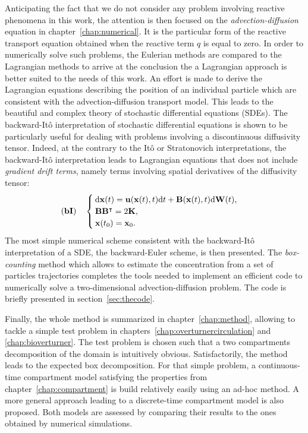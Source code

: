 Anticipating the fact that we do not consider any problem involving reactive phenomena in this work, the attention is then focused on the \textit{advection-diffusion} equation in chapter~\ref{chap:numerical}. It is the particular form of the reactive transport equation obtained when the reactive term $q$ is equal to zero. In order to numerically solve such problems, the Eulerian methods are compared to the Lagrangian methods to arrive at the conclusion the a Lagrangian approach is better suited to the needs of this work. An effort is made to derive the Lagrangian equations describing the position of an individual particle which are consistent with the advection-diffusion transport model. This leads to the beautiful and complex theory of stochastic differential equations (SDEs). The backward-Itô interpretation of stochastic differential equations is shown to be particularly useful for dealing with problems involving a discontinuous diffusivity tensor. Indeed, at the contrary to the Itô or Stratonovich interpretations, the backward-Itô interpretation leads to Lagrangian equations that does not include \textit{gradient drift terms}, namely terms involving spatial derivatives of the diffusivity tensor:
\[  
	\mathbf{(bI)} \quad
	\begin{cases}
		\mathrm d \mathbf{x}(t) =  \mathbf u(\mathbf x(t),t) \mathrm dt + \mathbf B(\mathbf x(t),t) \mathrm d \mathbf W(t),\\
		\mathbf B \mathbf B^\intercal = 2 \mathbf K,\\
		\mathbf x(t_0) = \mathbf x_0.
	\end{cases}{}
\]
The most simple numerical scheme consistent with the backward-Itô interpretation of a SDE, the backward-Euler scheme, is then presented. The \textit{box-counting} method which allows to estimate the concentration from a set of particles trajectories completes the tools needed to implement an efficient code to numerically solve a two-dimensional advection-diffusion problem. The code is briefly presented in section~\ref{sec:thecode}. 

Finally, the whole method is summarized in chapter~\ref{chap:method}, allowing to tackle a simple test problem in chapters~\ref{chap:overturnercirculation} and \ref{chap:bioverturner}. The test problem is chosen such that a two compartments decomposition of the domain is intuitively obvious. Satisfactorily, the method leads to the expected box decomposition. For that simple problem, a continuous-time compartment model satisfying the properties from chapter~\ref{chap:compartment} is build relatively easily using an ad-hoc method. A more general approach leading to a discrete-time compartment model is also proposed. Both models are assessed by comparing their results to the ones obtained by numerical simulations.

